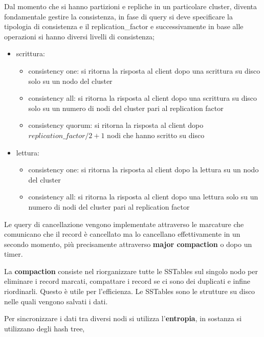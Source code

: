 Dal momento che si hanno partizioni e repliche in un particolare cluster, diventa 
fondamentale gestire la consistenza, in fase di query si deve specificare 
la tipologia di consistenza e il replication\_factor e successivamente in base alle operazioni 
si hanno diversi livelli di consistenza;
\begin{itemize}
      \item scrittura:
      \begin{itemize}
            \item consistency one: si ritorna la risposta al client dopo una scrittura 
            su disco solo su un nodo del cluster
            \item consistency all: si ritorna la risposta al client dopo una scrittura 
            su disco solo su un numero di nodi del cluster pari al replication factor 
            \item consistency quorum: si ritorna la risposta al client dopo $replication\_factor/2+1$ nodi che 
            hanno scritto su disco
      \end{itemize}
      
      \item lettura:
      \begin{itemize}
            \item consistency one: si ritorna la risposta al client dopo la lettura 
            su un nodo del cluster
            \item consistency all: si ritorna la risposta al client dopo una lettura 
            solo su un numero di nodi del cluster pari al replication factor 
      \end{itemize}
\end{itemize} 

Le query di cancellazione vengono implementate attraverso le marcature che 
comunicano che il record è cancellato ma lo cancellano effettivamente in un secondo 
momento, più precisamente attraverso \textbf{major compaction} o dopo un timer.

La \textbf{compaction} consiste nel riorganizzare tutte le SSTables sul singolo nodo per 
eliminare i record marcati, compattare i record se ci sono dei duplicati e infine 
riordinarli. Questo è utile per l'efficienza. Le SSTables sono le strutture su 
disco nelle quali vengono salvati i dati.

Per sincronizzare i dati tra diversi nodi si utilizza l'\textbf{entropia}, in sostanza
si utilizzano degli hash tree, %

